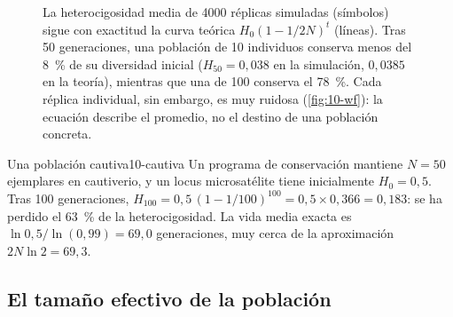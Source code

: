 \begin{figure}[t]
\centering
{}
\caption[Pérdida de heterocigosidad]{La heterocigosidad media de \num{4000} réplicas simuladas (símbolos) sigue con exactitud la curva teórica $H_0(1-1/2N)^t$ (líneas). Tras 50 generaciones, una población de 10 individuos conserva menos del \SI{8}{\percent} de su diversidad inicial ($H_{50}=0{,}038$ en la simulación, $0{,}0385$ en la teoría), mientras que una de 100 conserva el \SI{78}{\percent}. Cada réplica individual, sin embargo, es muy ruidosa (\cref{fig:10-wf}): la ecuación describe el promedio, no el destino de una población concreta.}
\label{fig:10-het}
\end{figure}

\begin{ejemplo}{Una población cautiva}{10-cautiva}
Un programa de conservación mantiene $N=50$ ejemplares en cautiverio, y un locus microsatélite tiene inicialmente $H_0=0{,}5$. Tras 100 generaciones, $H_{100}=0{,}5\,(1-1/100)^{100}=0{,}5\times0{,}366=0{,}183$: se ha perdido el \SI{63}{\percent} de la heterocigosidad. La vida media exacta es $\ln 0{,}5/\ln(0{,}99)=69{,}0$ generaciones, muy cerca de la aproximación $2N\ln2=69{,}3$.
\end{ejemplo}

\subsection{El tamaño efectivo de la población}

